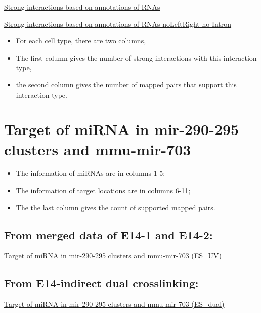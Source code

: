 \documentclass[letterpaper,10pt,english]{sphinxmanual}
\begin{document}
\href{http://systemsbio.ucsd.edu/RNA-Hi-C/Data/Count\_types\_interaction\_fragment\_wholeRNA.htm}{Strong interactions based on annotations of RNAs}

\href{http://systemsbio.ucsd.edu/RNA-Hi-C/Data/Count\_types\_interaction\_fragment\_wholeRNA\_noLeftRight.htm}{Strong interactions based on annotations of RNAs noLeftRight no Intron}
\begin{itemize}
\item {} 
For each cell type, there are two columns,

\item {} 
The first column gives the number of strong interactions with this interaction type,

\item {} 
the second column gives the number of mapped pairs that support this interaction type.

\end{itemize}


\section{Target of miRNA in mir-290-295 clusters and mmu-mir-703}
\label{Data_Resources:target-of-mirna-in-mir-290-295-clusters-and-mmu-mir-703}\begin{itemize}
\item {} 
The information of miRNAs are in columns 1-5;

\item {} 
The information of target locations are in columns 6-11;

\item {} 
The the last column gives the count of supported mapped pairs.

\end{itemize}


\subsection{From merged data of E14-1 and E14-2:}
\label{Data_Resources:id5}
\href{http://systemsbio.ucsd.edu/RNA-Hi-C/Data/ACCT\_GGCG\_interaction\_clusters\_miRNA.xlsx}{Target of miRNA in mir-290-295 clusters and mmu-mir-703 (ES\_UV)}


\subsection{From E14-indirect dual crosslinking:}
\label{Data_Resources:id6}
\href{http://systemsbio.ucsd.edu/RNA-Hi-C/Data/AATG\_interaction\_clusters\_miRNA.xlsx}{Target of miRNA in mir-290-295 clusters and mmu-mir-703 (ES\_dual)}
\end{document}
